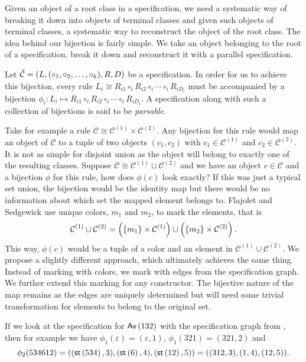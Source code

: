 \label{ch:pbijection}

Given an object of a root class in a specification, we need a systematic way of breaking it down into objects of terminal classes and given such objects of terminal classes, a systematic way to reconstruct the object of the root class. The idea behind our bijection is fairly simple. We take an object belonging to the root of a specification, break it down and reconstruct it with a parallel specification.

Let $\check{\mathcal{C}} = (L,(\circ_1,\circ_2,\dotsc,\circ_k),R,D)$ be a specification. In order for us to achieve this bijection, every rule $L_i \cong R_{i1} \circ_i R_{i2} \circ_i \dotsm \circ_i R_{iD_i}$ must be accompanied by a bijection $\phi_i: L_i \mapsto R_{i1} \circ_i R_{i2} \circ_i \dotsm \circ_i R_{iD_i}$. A specification along with such a collection of bijections is said to be \emph{parsable}.

Take for example a rule $\mathcal{C} \cong \mathcal{C}^{(1)} \times \mathcal{C}^{(2)}$. Any bijection for this rule would map an object of $\mathcal{C}$ to a tuple of two objects $(c_1,c_2)$ with $c_1 \in \mathcal{C}^{(1)}$ and $c_2 \in \mathcal{C}^{(2)}$. It is not as simple for disjoint union as the object will belong to exactly one of the resulting classes. Suppose $\mathcal{C} \cong \mathcal{C}^{(1)} \sqcup \mathcal{C}^{(2)}$ and we have an object $c\in\mathcal{C}$ and a bijection $\phi$ for this rule, how does $\phi(c)$ look exactly? If this was just a typical set union, the bijection would be the identity map but there would be no information about which set the mapped element belongs to. Flajolet and Sedgewick \cite{flajolet:ac} use unique colors, $m_1$ and $m_2$, to mark the elements, that is
\[
    \mathcal{C}^{(1)} \sqcup \mathcal{C}^{(2)} = \left(\left\{m_1\right\} \times \mathcal{C}^{(1)}\right) \cup \left(\left\{m_2\right\} \times \mathcal{C}^{(2)}\right).
\]
This way, $\phi(c)$ would be a tuple of a color and an element in $\mathcal{C}^{(1)} \cup \mathcal{C}^{(2)}$. We propose a slightly different approach, which ultimately achieves the same thing. Instead of marking with colors, we mark with edges from the specification graph. We further extend this marking for any constructor. The bijective nature of the map remains as the edges are uniquely determined but will need some trivial transformation for elements to belong to the original set.

If we look at the specification for $\textsf{Av}\left(132\right)$ with the specification graph from , then for example we have $\phi_1(\varepsilon) = (\varepsilon, 1)$, $\phi_1(321) = (321, 2)$ and 
\[
    \phi_2(534612) = ((\textsf{st}\left(534\right),3), (\textsf{st}\left(6\right),4), (\textsf{st}\left(12\right),5)) = ((312,3), (1,4), (12,5)).
\]

